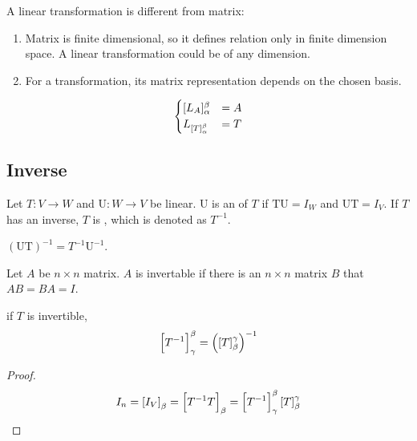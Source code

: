 A linear transformation is different from matrix:
\begin{enumerate}
    \item Matrix is finite dimensional, so it defines relation only in finite dimension space. A linear transformation could be of any dimension.
    \item For a transformation, its matrix representation depends on the chosen basis.
\end{enumerate}



\begin{theorem}
    \begin{equation}
        \begin{aligned}
            \begin{cases}
            [L_A]_\alpha^\beta &= A \\
            L_{\coordinate{T}_\alpha^\beta} &= T
        \end{cases}    
        \end{aligned}
    \end{equation}
\end{theorem}


\subsection{Inverse}

\begin{definition}
	Let $T: V\rightarrow W$ and $\mathrm{U}:W \rightarrow V$ be linear. $\mathrm{U}$ is an    of $T$ if $\mathrm{TU} = I_W$ and $\mathrm{UT} = I_V$. If $T$ has an inverse, $T$ is   , which is denoted as $T^{-1}$.
\end{definition}

\begin{theorem}
    $(\mathrm{UT})^{-1} = T^{-1} \mathrm{U}^{-1}$.
\end{theorem}

\begin{definition}
	Let $A$ be $n \times n$ matrix. $A$ is invertable if there is an $n \times n$ matrix $B$ that $AB=BA=I$.
\end{definition}

\begin{theorem}
    if $T$ is invertible, 
	\begin{equation*}
		\coordinate{T^{-1}}_\gamma^\beta = \mleft(\coordinate{T}_\beta^\gamma \mright)^{-1}
	\end{equation*}
\end{theorem}
\begin{proof}
	\begin{equation*}
		I_n = \coordinate{I_V}_\beta = \coordinate{T^{-1} T}_\beta = \coordinate{T^{-1}}_\gamma^\beta \coordinate{T}_\beta^\gamma
	\end{equation*}
\end{proof}


